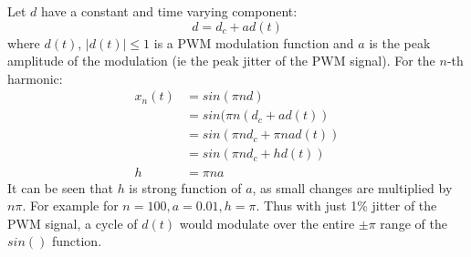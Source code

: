 \documentclass{article}
\begin{document}
Let $d$ have a constant and time varying component:
\begin{equation}
d=d_c+ad(t)
\end{equation}
where $d(t)$, $|d(t)| \le 1$ is a PWM modulation function and $a$ is the peak amplitude of the modulation (ie the peak jitter of the PWM signal). For the $n$-th harmonic:
\begin{equation} \label{eq:pwm_n}
\begin{split}
x_n(t) &= sin(\pi n d) \\
       &= sin(\pi n (d_c+ad(t)) \\
       &= sin(\pi n d_c + \pi n a d(t)) \\
       &= sin(\pi n d_c + h d(t))  \\
     h &= \pi n a
\end{split}
\end{equation}
It can be seen that $h$ is strong function of $a$, as small changes are multiplied by $n \pi$. For example for $n=100, a=0.01, h = \pi$.  Thus with just 1\% jitter of the PWM signal, a cycle of $d(t)$ would modulate over the entire $\pm \pi$ range of the $sin()$ function.
\end{document}
